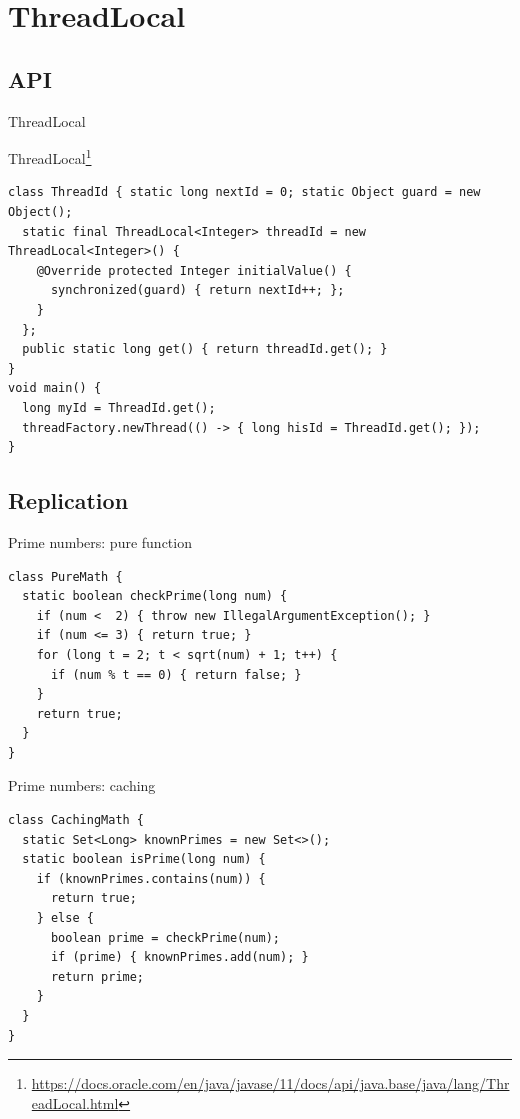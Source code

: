 

\section{ThreadLocal}
\showTOCSub

\subsection{API}

\begin{frame}[fragile]{ThreadLocal}

ThreadLocal\footnote{\tiny\url{https://docs.oracle.com/en/java/javase/11/docs/api/java.base/java/lang/ThreadLocal.html}}
\begin{verbatim}
class ThreadId { static long nextId = 0; static Object guard = new Object();  
  static final ThreadLocal<Integer> threadId = new ThreadLocal<Integer>() {
    @Override protected Integer initialValue() {
      synchronized(guard) { return nextId++; };
    }
  };
  public static long get() { return threadId.get(); }
}
void main() {
  long myId = ThreadId.get();
  threadFactory.newThread(() -> { long hisId = ThreadId.get(); });
}
\end{verbatim}
\end{frame}

\subsection{Replication}
\showTOCSub

\begin{frame}[fragile]{Prime numbers: pure function}

\begin{verbatim}
class PureMath {
  static boolean checkPrime(long num) {
    if (num <  2) { throw new IllegalArgumentException(); }
    if (num <= 3) { return true; }
    for (long t = 2; t < sqrt(num) + 1; t++) {
      if (num % t == 0) { return false; }
    }
    return true;
  }
}
\end{verbatim}
\end{frame}

\begin{frame}{Prime numbers: caching}

\begin{verbatim}
class CachingMath {
  static Set<Long> knownPrimes = new Set<>();
  static boolean isPrime(long num) {
    if (knownPrimes.contains(num)) { 
      return true; 
    } else {
      boolean prime = checkPrime(num);
      if (prime) { knownPrimes.add(num); }
      return prime;
    }
  }
}
\end{verbatim}
\end{frame}

